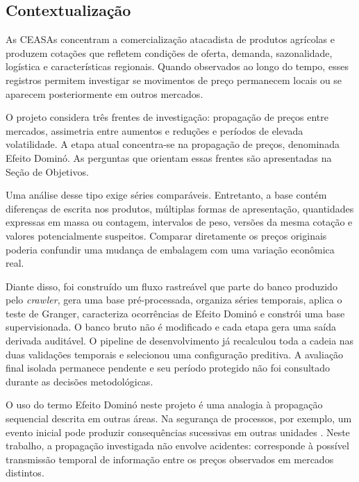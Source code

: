 \documentclass[12pt,a4paper]{article}
\begin{document}
\subsection{Contextualização}

As CEASAs concentram a comercialização atacadista de produtos agrícolas e
produzem cotações que refletem condições de oferta, demanda, sazonalidade,
logística e características regionais. Quando observados ao longo do tempo,
esses registros permitem investigar se movimentos de preço permanecem locais
ou se aparecem posteriormente em outros mercados.

O projeto considera três frentes de investigação: propagação de preços entre
mercados, assimetria entre aumentos e reduções e períodos de elevada
volatilidade. A etapa atual concentra-se na propagação de preços, denominada
Efeito Dominó. As perguntas que orientam essas frentes são apresentadas na
Seção de Objetivos.

Uma análise desse tipo exige séries comparáveis. Entretanto, a base contém
diferenças de escrita nos produtos, múltiplas formas de apresentação,
quantidades expressas em massa ou contagem, intervalos de peso, versões da
mesma cotação e valores potencialmente suspeitos. Comparar diretamente os
preços originais poderia confundir uma mudança de embalagem com uma variação
econômica real.

Diante disso, foi construído um fluxo rastreável que parte do banco produzido
pelo \textit{crawler}, gera uma base pré-processada, organiza séries temporais,
aplica o teste de Granger, caracteriza ocorrências de Efeito Dominó e constrói
uma base supervisionada. O banco bruto não é modificado e cada etapa gera uma
saída derivada auditável. O pipeline de desenvolvimento já recalculou toda a
cadeia nas duas validações temporais e selecionou uma configuração preditiva.
A avaliação final isolada permanece pendente e seu período protegido não foi
consultado durante as decisões metodológicas.

O uso do termo Efeito Dominó neste projeto é uma analogia à propagação
sequencial descrita em outras áreas. Na segurança de processos, por exemplo,
um evento inicial pode produzir consequências sucessivas em outras unidades
\cite{swuste2019}. Neste trabalho, a propagação investigada não envolve
acidentes: corresponde à possível transmissão temporal de informação entre os
preços observados em mercados distintos.

\end{document}
